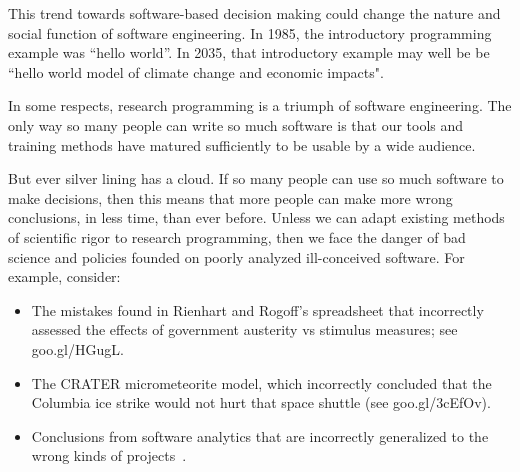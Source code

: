 \documentclass[journal]{IEEEtran}
\newcommand{\bi}{\begin{itemize}}
\newcommand{\ei}{\end{itemize}}
\begin{document}
This trend towards software-based decision making could change the nature and social function of software engineering.
In 1985, the introductory programming example was ``hello world''.  
In 2035, that introductory example
may well be be ``hello world model of climate change and economic
impacts". 


In some respects,  research programming is a triumph of software engineering.
The only way so many people can write so much software is that   our  tools and training methods have matured sufficiently to be usable by a wide audience.  
 
But ever silver lining has a cloud. If so many people can use so much software to make decisions, then this means that more
people can make more wrong conclusions, in less time, than
ever before. Unless we can adapt existing methods of scientific rigor   to research programming, then we face the danger of bad science and   policies founded on  poorly analyzed ill-conceived software. For
example, consider:
\bi\item The mistakes found in Rienhart and Rogoff's spreadsheet that incorrectly assessed the
effects of  government  austerity   vs stimulus measures; see  goo.gl/HGugL.  
\item
The CRATER  micrometeorite  model, which  incorrectly
concluded that the Columbia  ice strike would not hurt that space shuttle (see goo.gl/3cEfOv).
\item Conclusions from software analytics that
are incorrectly generalized to the wrong kinds of projects~\cite{shull02}.
\ei
\end{document}
